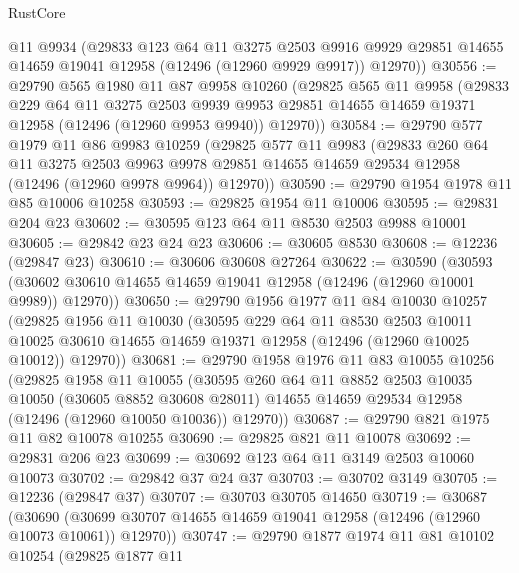 \begin{lexlean}{RustCore}
\begin{coremodule}
      @11
      @9934
      (@29833
        @123
        @64
        @11
        @3275
        @2503
        @9916
        @9929
        @29851
        @14655
        @14659
        @19041
        @12958
        (@12496 (@12960 @9929 @9917))
        @12970))
@30556 := @29790
    @565
    @1980
    @11
    @87
    @9958
    @10260
    (@29825
      @565
      @11
      @9958
      (@29833
        @229
        @64
        @11
        @3275
        @2503
        @9939
        @9953
        @29851
        @14655
        @14659
        @19371
        @12958
        (@12496 (@12960 @9953 @9940))
        @12970))
@30584 := @29790
    @577
    @1979
    @11
    @86
    @9983
    @10259
    (@29825
      @577
      @11
      @9983
      (@29833
        @260
        @64
        @11
        @3275
        @2503
        @9963
        @9978
        @29851
        @14655
        @14659
        @29534
        @12958
        (@12496 (@12960 @9978 @9964))
        @12970))
@30590 := @29790 @1954 @1978 @11 @85 @10006 @10258
@30593 := @29825 @1954 @11 @10006
@30595 := @29831 @204 @23
@30602 := @30595 @123 @64 @11 @8530 @2503 @9988 @10001
@30605 := @29842 @23 @24 @23
@30606 := @30605 @8530
@30608 := @12236 (@29847 @23)
@30610 := @30606 @30608 @27264
@30622 := @30590
    (@30593 (@30602 @30610 @14655 @14659 @19041 @12958 (@12496 (@12960 @10001 @9989)) @12970))
@30650 := @29790
    @1956
    @1977
    @11
    @84
    @10030
    @10257
    (@29825
      @1956
      @11
      @10030
      (@30595
        @229
        @64
        @11
        @8530
        @2503
        @10011
        @10025
        @30610
        @14655
        @14659
        @19371
        @12958
        (@12496 (@12960 @10025 @10012))
        @12970))
@30681 := @29790
    @1958
    @1976
    @11
    @83
    @10055
    @10256
    (@29825
      @1958
      @11
      @10055
      (@30595
        @260
        @64
        @11
        @8852
        @2503
        @10035
        @10050
        (@30605 @8852 @30608 @28011)
        @14655
        @14659
        @29534
        @12958
        (@12496 (@12960 @10050 @10036))
        @12970))
@30687 := @29790 @821 @1975 @11 @82 @10078 @10255
@30690 := @29825 @821 @11 @10078
@30692 := @29831 @206 @23
@30699 := @30692 @123 @64 @11 @3149 @2503 @10060 @10073
@30702 := @29842 @37 @24 @37
@30703 := @30702 @3149
@30705 := @12236 (@29847 @37)
@30707 := @30703 @30705 @14650
@30719 := @30687
    (@30690 (@30699 @30707 @14655 @14659 @19041 @12958 (@12496 (@12960 @10073 @10061)) @12970))
@30747 := @29790
    @1877
    @1974
    @11
    @81
    @10102
    @10254
    (@29825
      @1877
      @11

\end{coremodule}
\end{lexlean}
